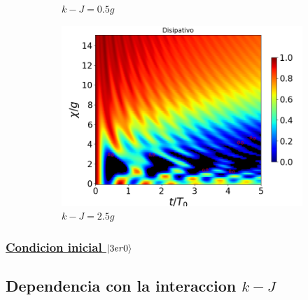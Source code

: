 \begin{figure}[h]
\begin{subfigure}{0.49\textwidth}
        \caption{$k-J=0.5g$}
        \label{fig4:concu x 1 d1}
    \end{subfigure}
    \hfill
    \begin{subfigure}{0.49\textwidth}
        \includegraphics[width=\textwidth]{figuras/ch4/concu/chi/eg1+ge1 d=0.0g k=2.5g J=0.0g gamma=0.25g concu chi dis.png}
        \caption{$k-J=2.5g$}
        \label{fig4:concu x 1 d2}
    \end{subfigure}
    \caption{}
    \label{}
\end{figure}
\subsubsection{\underline{Condicion inicial $\ket{3er0}$}}


\subsection{Dependencia con la interaccion $k-J$}
